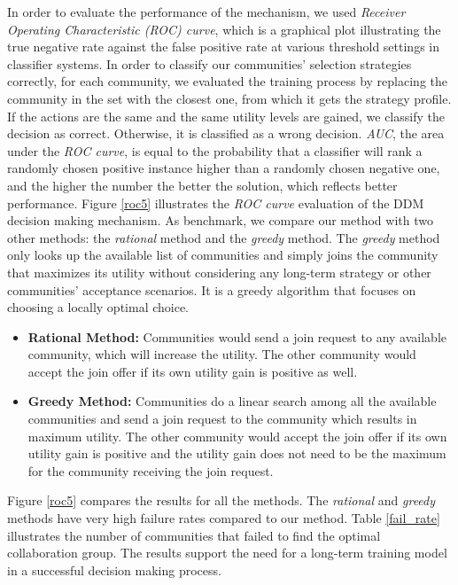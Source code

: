 \documentclass[11pt,onecolumn]{IEEEtran}
\begin{document}
{In order to evaluate the performance of the mechanism, we used \emph{Receiver Operating Characteristic (ROC) curve}, which is a graphical plot illustrating the true negative rate against the false positive rate at various threshold settings in classifier systems. In order to classify our communities' selection strategies correctly, for each community, we evaluated the training process by replacing the community in the set with the closest one, from which it gets the strategy profile. If the actions are the same and the same utility levels are gained, we classify the decision as correct. Otherwise, it is classified as a wrong decision. \emph{AUC}, the area under the \emph{ROC curve}, is equal to the probability that a classifier will rank a randomly chosen positive instance higher than a randomly chosen negative one, and the higher the number the better the solution, which reflects better performance.  Figure \ref{roc5} illustrates the \emph{ROC curve} evaluation of the DDM decision making mechanism. As benchmark, we compare our method with two other methods: the \emph{rational} method and the \emph{greedy} method. The \emph{greedy} method only looks up the available list of communities and simply joins the community that maximizes its utility without considering any long-term strategy or other communities' acceptance scenarios. It is a greedy algorithm that focuses on choosing a locally optimal choice. 

\begin{itemize}
  \item {\bf Rational Method:} Communities would send a join request to any available community, which will increase the utility. The other community would accept the join offer if its own utility gain is positive as well.
	\item {\bf Greedy Method:} Communities do a linear search among all the available communities and send a join request to the community which results in maximum utility. The other community would accept the join offer if its own utility gain is positive and the utility gain does not need to be the maximum for the community receiving the join request.
\end{itemize}

Figure \ref{roc5} compares the results for all the methods. The \emph{rational} and \emph{greedy} methods have very high failure rates compared to our method. Table \ref{fail_rate} illustrates the number of communities that failed to find the optimal collaboration group. The results support the need for a long-term training model in a successful decision making process.

}
\end{document}
